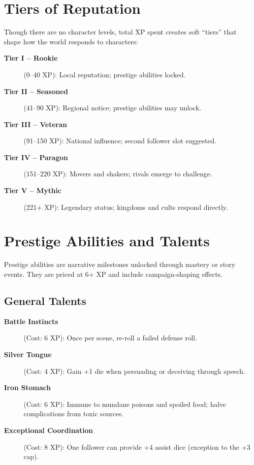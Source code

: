 \section{Tiers of Reputation}
\label{sec:reputation-tiers}

Though there are no character levels, total XP spent creates soft ``tiers'' that shape how the world responds to characters:

\begin{description}
\item[\textbf{Tier I -- Rookie}] (0--40 XP): Local reputation; prestige abilities locked.
\item[\textbf{Tier II -- Seasoned}] (41--90 XP): Regional notice; prestige abilities may unlock.
\item[\textbf{Tier III -- Veteran}] (91--150 XP): National influence; second follower slot suggested.
\item[\textbf{Tier IV -- Paragon}] (151--220 XP): Movers and shakers; rivals emerge to challenge.
\item[\textbf{Tier V -- Mythic}] (221+ XP): Legendary status; kingdoms and cults respond directly.
\end{description}

\section{Prestige Abilities and Talents}
\label{sec:prestige-abilities}

Prestige abilities are narrative milestones unlocked through mastery or story events. They are priced at 6+ XP and include campaign-shaping effects. 

\subsection{General Talents}
\label{subsec:general-talents}

\begin{description}
\item[\textbf{Battle Instincts}] (Cost: 6 XP): Once per scene, re-roll a failed defense roll.
\item[\textbf{Silver Tongue}] (Cost: 4 XP): Gain +1 die when persuading or deceiving through speech.
\item[\textbf{Iron Stomach}] (Cost: 6 XP): Immune to mundane poisons and spoiled food; halve complications from toxic sources.
\item[\textbf{Exceptional Coordination}] (Cost: 8 XP): One follower can provide +4 assist dice (exception to the +3 cap).
\end{description}

